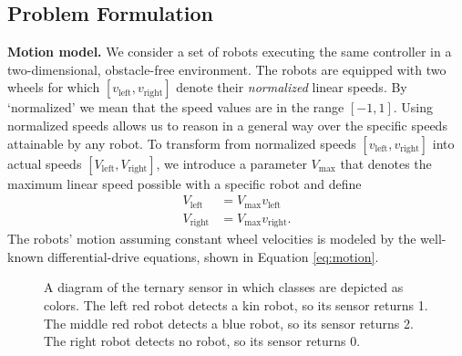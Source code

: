 \documentclass[letterpaper, 10 pt, conference]{ieeeconf}
\newcommand{\myparagraph}[1]{\textbf{#1.}}
\begin{document}
\subsection{Problem Formulation}

\newcommand{\vL}{\ensuremath{v_{\text{left}}}}
\newcommand{\vR}{\ensuremath{v_{\text{right}}}}
\newcommand{\vaL}{\ensuremath{V_{\text{left}}}}
\newcommand{\vaR}{\ensuremath{V_{\text{right}}}}
\newcommand{\VM}{\ensuremath{V_{\text{max}}}}
\myparagraph{Motion model}
We consider a set of robots executing the same controller in a two-dimensional,
obstacle-free environment. The robots are equipped with two wheels for which
$[\vL,\vR]$ denote their \emph{normalized} linear speeds. By `normalized' we
mean that the speed values are in the range $[-1, 1]$. Using normalized speeds
allows us to reason in a general way over the specific speeds attainable by any
robot. To transform from normalized speeds $[\vL,\vR]$ into actual speeds
$[\vaL,\vaR]$, we introduce a parameter $\VM$ that denotes the maximum linear
speed possible with a specific robot and define
\begin{align}
  \vaL &= \VM \vL\\
  \vaR &= \VM \vR.
\end{align}
The robots' motion assuming constant wheel velocities is modeled by the well-known differential-drive
equations, shown in Equation \eqref{eq:motion}.

\newcommand{\vPN}[2]{\ensuremath{v_{\text{#1}}}^{S=#2}}
\newcommand{\robot}[2]{%
  \filldraw[draw=#2,fill=#2!20] (#1) circle(5mm);
  \draw[draw=#2,->,-Stealth,rotate around={0:(#1)}] (#1) -- +(5mm,0);
  \fill[fill=gray!20] ($(#1)+(5mm,0)$) -- +( 45:1cm) -- +(-45:1cm) -- cycle;%
  \fill[fill=#2] ($(#1)+(5mm,0)$) circle (1mm);%
  }

\begin{figure}[t]
  \centering
  \caption{A diagram of the ternary sensor in which classes are depicted
  as colors. The left red robot detects a kin robot, so its sensor
  returns 1. The middle red robot detects a blue robot, so its sensor
  returns 2. The right robot detects no robot, so its sensor returns
  0.}
  \label{fig:sensor}
\end{figure}
\end{document}

